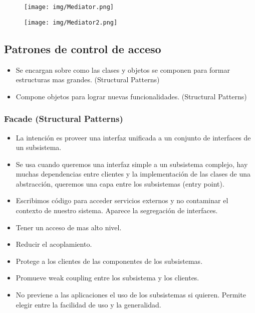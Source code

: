 \begin{figure}[!htb]
    \centering
    \texttt{[image: img/Mediator.png]}
\end{figure}

\begin{figure}[!htb]
    \centering
    \texttt{[image: img/Mediator2.png]}
\end{figure}

\subsection*{Patrones de control de acceso}

\begin{itemize}
    \item Se encargan sobre como las clases y objetos se componen para formar estructuras mas grandes. (Structural Patterns)
    \item Compone objetos para lograr nuevas funcionalidades. (Structural Patterns)
\end{itemize}

\subsubsection*{Facade (Structural Patterns)}
\begin{itemize}
\item La intención es proveer una interfaz unificada a un conjunto de interfaces de un subsistema.
\item Se usa cuando queremos una interfaz simple a un subsistema complejo, hay muchas dependencias entre clientes y la implementación de las clases de una abstracción, queremos una capa entre los subsistemas (entry point).
\item Escribimos código para acceder servicios externos y no contaminar el contexto de nuestro sistema. Aparece la segregación de interfaces.
\item Tener un acceso de mas alto nivel.
\item Reducir el acoplamiento.
\item Protege a los clientes de las componentes de los subsistemas.
\item Promueve weak coupling entre los subsistema y los clientes.
\item No previene a las aplicaciones el uso de los subsistemas si quieren. Permite elegir entre la facilidad de uso y la generalidad.
\end{itemize}

